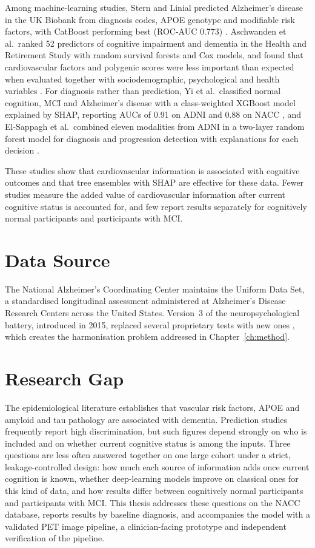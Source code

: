 Among machine-learning studies, Stern and Linial predicted Alzheimer's disease in the UK Biobank from diagnosis codes, APOE genotype and modifiable risk factors, with CatBoost performing best (ROC-AUC 0.773) \cite{stern2026}. Aschwanden et al.\ ranked 52 predictors of cognitive impairment and dementia in the Health and Retirement Study with random survival forests and Cox models, and found that cardiovascular factors and polygenic scores were less important than expected when evaluated together with sociodemographic, psychological and health variables \cite{aschwanden2020}. For diagnosis rather than prediction, Yi et al.\ classified normal cognition, MCI and Alzheimer's disease with a class-weighted XGBoost model explained by SHAP, reporting AUCs of 0.91 on ADNI and 0.88 on NACC \cite{yi2023}, and El-Sappagh et al.\ combined eleven modalities from ADNI in a two-layer random forest model for diagnosis and progression detection with explanations for each decision \cite{elsappagh2021}.

These studies show that cardiovascular information is associated with cognitive outcomes and that tree ensembles with SHAP are effective for these data. Fewer studies measure the added value of cardiovascular information after current cognitive status is accounted for, and few report results separately for cognitively normal participants and participants with MCI.

\section{Data Source}

The National Alzheimer's Coordinating Center maintains the Uniform Data Set, a standardised longitudinal assessment administered at Alzheimer's Disease Research Centers across the United States. Version~3 of the neuropsychological battery, introduced in 2015, replaced several proprietary tests with new ones \cite{weintraub2018}, which creates the harmonisation problem addressed in Chapter~\ref{ch:method}.

\section{Research Gap}

The epidemiological literature establishes that vascular risk factors, APOE and amyloid and tau pathology are associated with dementia. Prediction studies frequently report high discrimination, but such figures depend strongly on who is included and on whether current cognitive status is among the inputs. Three questions are less often answered together on one large cohort under a strict, leakage-controlled design: how much each source of information adds once current cognition is known, whether deep-learning models improve on classical ones for this kind of data, and how results differ between cognitively normal participants and participants with MCI. This thesis addresses these questions on the NACC database, reports results by baseline diagnosis, and accompanies the model with a validated PET image pipeline, a clinician-facing prototype and independent verification of the pipeline.

